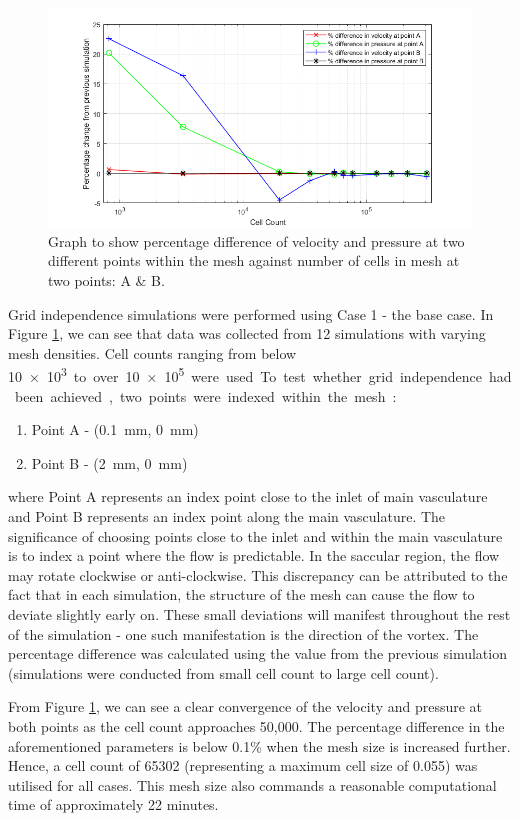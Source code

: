 \documentclass[journal,twoside,web]{ieeecolor}
\begin{document}
\begin{figure}[!t]
    \centerline{\includegraphics[width=\columnwidth]{img/fig2.png}}
    \caption{Graph to show percentage difference of velocity and pressure at two different points within the mesh against number of cells in mesh at two points: A \& B.}
    \label{fig2}
\end{figure}

Grid independence simulations were performed using Case 1 - the base case. In Figure \ref{fig2}, we can see that data was collected from 12 simulations with varying mesh densities. Cell counts ranging from below \SI{10e3} to over \SI{10e5} were used. To test whether grid independence had been achieved, two points were indexed within the mesh:
\begin{enumerate}
    \item Point A - (\SI{0.1}{mm}, \SI{0}{mm})
    \item Point B - (\SI{2}{mm}, \SI{0}{mm})
\end{enumerate}
where Point A represents an index point close to the inlet of main vasculature and Point B represents an index point along the main vasculature. The significance of choosing points close to the inlet and within the main vasculature is to index a point where the flow is predictable. In the saccular region, the flow may rotate clockwise or anti-clockwise. This discrepancy can be attributed to the fact that in each simulation, the structure of the mesh can cause the flow to deviate slightly early on. These small deviations will manifest throughout the rest of the simulation - one such manifestation is the direction of the vortex. The percentage difference was calculated using the value from the previous simulation (simulations were conducted from small cell count to large cell count).

From Figure \ref{fig2}, we can see a clear convergence of the velocity and pressure at both points as the cell count approaches 50,000. The percentage difference in the aforementioned parameters is below 0.1\% when the mesh size is increased further. Hence, a cell count of 65302 (representing a maximum cell size of 0.055) was utilised for all cases. This mesh size also commands a reasonable computational time of approximately 22 minutes.
\end{document}
